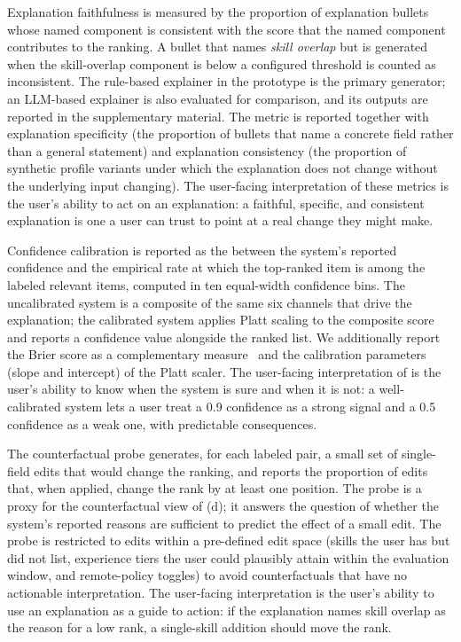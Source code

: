Explanation faithfulness is measured by the proportion of explanation bullets whose named component is consistent with the score that the named component contributes to the ranking.
A bullet that names \emph{skill overlap} but is generated when the skill-overlap component is below a configured threshold is counted as inconsistent.
The rule-based explainer in the prototype is the primary generator; an LLM-based explainer is also evaluated for comparison, and its outputs are reported in the supplementary material.
The metric is reported together with explanation specificity (the proportion of bullets that name a concrete field rather than a general statement) and explanation consistency (the proportion of synthetic profile variants under which the explanation does not change without the underlying input changing).
The user-facing interpretation of these metrics is the user's ability to act on an explanation: a faithful, specific, and consistent explanation is one a user can trust to point at a real change they might make.

Confidence calibration is reported as the \ece{} between the system's reported confidence and the empirical rate at which the top-ranked item is among the labeled relevant items, computed in ten equal-width confidence bins.
The uncalibrated system is a composite of the same six channels that drive the explanation; the calibrated system applies Platt scaling to the composite score~\cite{platt1999probabilistic,guo2017calibration} and reports a confidence value alongside the ranked list.
We additionally report the Brier score as a complementary measure~\cite{brier1950verification} and the calibration parameters (slope and intercept) of the Platt scaler.
The user-facing interpretation of \ece{} is the user's ability to know when the system is sure and when it is not: a well-calibrated system lets a user treat a 0.9 confidence as a strong signal and a 0.5 confidence as a weak one, with predictable consequences.

The counterfactual probe generates, for each labeled pair, a small set of single-field edits that would change the ranking, and reports the proportion of edits that, when applied, change the rank by at least one position.
The probe is a proxy for the counterfactual view of (d); it answers the question of whether the system's reported reasons are sufficient to predict the effect of a small edit.
The probe is restricted to edits within a pre-defined edit space (skills the user has but did not list, experience tiers the user could plausibly attain within the evaluation window, and remote-policy toggles) to avoid counterfactuals that have no actionable interpretation.
The user-facing interpretation is the user's ability to use an explanation as a guide to action: if the explanation names skill overlap as the reason for a low rank, a single-skill addition should move the rank.

